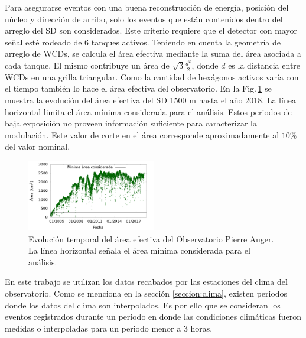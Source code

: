 	Para asegurarse eventos con una buena reconstrucción de  energía, posición del núcleo y dirección de arribo, solo los eventos que están contenidos dentro del arreglo del SD son considerados. Este criterio requiere que el detector con mayor señal esté rodeado de 6 tanques activos. Teniendo en cuenta la geometría de arreglo de WCDs, se calcula el área efectiva mediante la suma del área asociada a cada tanque. El mismo contribuye un área de $\sqrt{3} \frac{d^2}{2}$, donde $d$ es la distancia entre WCDs en una grilla triangular. Como la cantidad de hexágonos activos varía con el tiempo también lo hace  el área efectiva del observatorio. En la Fig.\,\ref{fig:area} se muestra la evolución del área efectiva del SD 1500 m hasta el año 2018. La línea horizontal  limita el área mínima considerada para el análisis. Estos periodos de baja exposición no proveen información suficiente para caracterizar la modulación.
	Este valor de corte en el área corresponde aproximadamente al $10\%$ del valor nominal.
	\begin{figure}[H]
		\centering
		\includegraphics[width=0.5\textwidth]{../clima/Graphs/clima/area.png}
		\caption{Evolución temporal del área efectiva del Observatorio Pierre Auger. La línea horizontal señala el área mínima considerada para el análisis.}
		\label{fig:area}
	\end{figure}

	En este trabajo se utilizan los datos recabados por las estaciones del clima del observatorio. Como se menciona en la sección \ref{seccion:clima}, existen periodos donde los datos del clima son interpolados. Es por ello que se consideran los eventos registrados durante un periodo en donde las condiciones climáticas fueron medidas o interpoladas para un periodo menor a 3 horas. %

